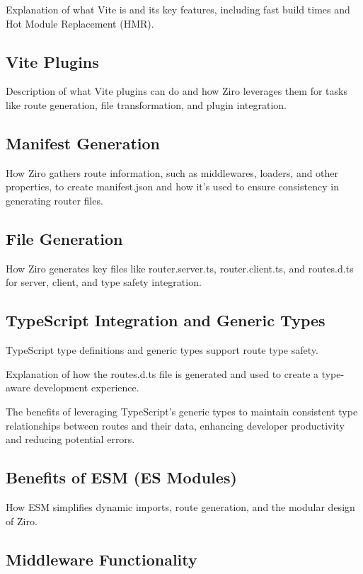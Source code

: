 Explanation of what Vite is and its key features, including fast build times and Hot Module Replacement (HMR).

\subsection{Vite Plugins}

Description of what Vite plugins can do and how Ziro leverages them for tasks like route generation, file transformation, and plugin integration.

\subsection{Manifest Generation}

How Ziro gathers route information, such as middlewares, loaders, and other properties, to create manifest.json and how it's used to ensure consistency in generating router files.

\subsection{File Generation}

How Ziro generates key files like router.server.ts, router.client.ts, and routes.d.ts for server, client, and type safety integration.

\subsection{TypeScript Integration and Generic Types}

TypeScript type definitions and generic types support route type safety.

Explanation of how the routes.d.ts file is generated and used to create a type-aware development experience.

The benefits of leveraging TypeScript's generic types to maintain consistent type relationships between routes and their data, enhancing developer productivity and reducing potential errors.

\subsection{Benefits of ESM (ES Modules)}

How ESM simplifies dynamic imports, route generation, and the modular design of Ziro.

\subsection{Middleware Functionality}

